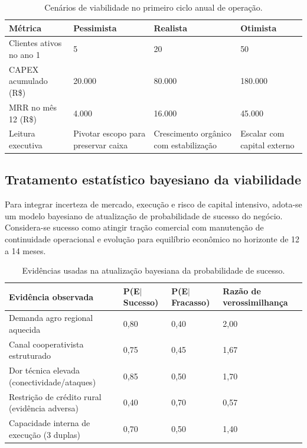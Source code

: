 \begin{table}[htb]
\centering
\caption{Cenários de viabilidade no primeiro ciclo anual de operação.}
\label{tab:cenarios-viabilidade}
\begin{tabular}{|p{}|p{}|p{}|p{}|}
\hline
\textbf{Métrica} & \textbf{Pessimista} & \textbf{Realista} & \textbf{Otimista} \\
\hline
Clientes ativos no ano 1 & 5 & 20 & 50 \\
\hline
CAPEX acumulado (R\$) & 20.000 & 80.000 & 180.000 \\
\hline
MRR no mês 12 (R\$) & 4.000 & 16.000 & 45.000 \\
\hline
Leitura executiva & Pivotar escopo para preservar caixa & Crescimento orgânico com estabilização & Escalar com capital externo \\
\hline
\end{tabular}
\end{table}

\subsection{Tratamento estatístico bayesiano da viabilidade}

Para integrar incerteza de mercado, execução e risco de capital intensivo, adota-se um modelo bayesiano de atualização de probabilidade de sucesso do negócio. Considera-se sucesso como atingir tração comercial com manutenção de continuidade operacional e evolução para equilíbrio econômico no horizonte de 12 a 14 meses.

\begin{table}[htb]
\centering
\caption{Evidências usadas na atualização bayesiana da probabilidade de sucesso.}
\label{tab:bayes-evidencias}
\begin{tabular}{|p{}|p{}|p{}|p{}|}
\hline
\textbf{Evidência observada} & \textbf{P(E$\mid$Sucesso)} & \textbf{P(E$\mid$Fracasso)} & \textbf{Razão de verossimilhança} \\
\hline
Demanda agro regional aquecida & 0,80 & 0,40 & 2,00 \\
\hline
Canal cooperativista estruturado & 0,75 & 0,45 & 1,67 \\
\hline
Dor técnica elevada (conectividade/ataques) & 0,85 & 0,50 & 1,70 \\
\hline
Restrição de crédito rural (evidência adversa) & 0,40 & 0,70 & 0,57 \\
\hline
Capacidade interna de execução (3 duplas) & 0,70 & 0,50 & 1,40 \\
\hline
\end{tabular}
\end{table}

